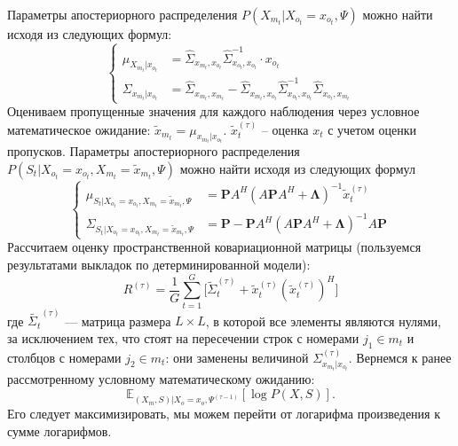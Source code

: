 \documentclass[11pt]{article}
\newcommand{\Expect}{\mathbb{E}}
\begin{document}
Параметры апостериорного распределения $P(X_{m_t}|X_{o_t}=x_{o_t},\Psi)$ можно найти исходя из следующих формул:
\begin{equation}
\left\{ \begin{aligned} 
\mu_{X_{m_t}|x_{o_t}} &= \hat{\Sigma}_{x_{m_t},x_{o_t}}\hat{\Sigma}_{x_{o_t},x_{o_t}}^{-1}\cdot x_{o_t} \\
\Sigma_{x_{m_t}|x_{o_t}} &= \hat{\Sigma}_{x_{m_t},x_{m_t}}-\hat{\Sigma}_{x_{m_t},x_{o_t}}\hat{\Sigma}_{x_{o_t},x_{o_t}}^{-1}\hat{\Sigma}_{x_{o_t},x_{m_t}}
\end{aligned} \right.
\end{equation}
Оцениваем пропущенные значения для каждого наблюдения через условное математическое ожидание:
$\widetilde{x}_{m_t} = \mu_{x_{m_t}|x_{o_t}}$. $\widetilde{x}_t^{(\tau)}$ -- оценка $x_t$ с учетом оценки пропусков.
Параметры апостериорного распределения $P(S_t|X_{o_t} = x_{o_t}, X_{m_t} = \widetilde{x}_{m_t}, \Psi)$ можно найти исходя из следующих формул
\begin{equation}
\left\{ \begin{aligned} 
\mu_{S_t|X_{o_t} = x_{o_t}, X_{m_t} = \widetilde{x}_{m_t}, \Psi} &= \mathbf{P}A^H(A\mathbf{P}A^H+\mathbf{\Lambda})^{-1}\widetilde{x}_t^{(\tau)} \\
\Sigma_{S_t|X_{o_t} = x_{o_t}, X_{m_t} = \widetilde{x}_{m_t}, \Psi} &= \mathbf{P} - \mathbf{P}A^H(A\mathbf{P}A^H+\mathbf{\Lambda})^{-1}A\mathbf{P}
\end{aligned} \right.
\end{equation}
Рассчитаем оценку пространственной ковариационной матрицы (пользуемся результатами выкладок по детерминированной модели):
\begin{equation}
{R}^{(\tau)} = \frac{1}{G} \sum_{t = 1}^{G} \Big[ \widetilde{\Sigma}_{t}^{(\tau)} + \widetilde{x}_t^{(\tau)}(\widetilde{x}_t^{(\tau)})^H \Big]
\end{equation}
где $\widetilde{\Sigma_{t}}^{(\tau)}$ --- матрица размера $L \times L$, в которой все элементы являются нулями, за исключением тех, что стоят на пересечении строк с номерами $j_1 \in m_t$ и столбцов с номерами $j_2 \in m_t$: они заменены величиной $\Sigma^{(\tau)}_{x_{m_t}|x_{o_t}}$.
Вернемся к ранее рассмотренному условному математическому ожиданию:
\begin{equation*}
 \Expect_{(X_m,S)|X_o=x_o, \Psi^{(\tau-1)}}[\log P(X, S)].
\end{equation*}
Его следует максимизировать, мы можем перейти от логарифма произведения к сумме логарифмов. 
\\
\end{document}
